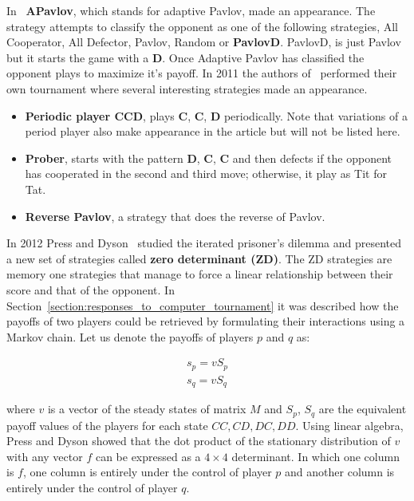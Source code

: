 \documentclass{article}
\theoremstyle{definition}
\begin{document}
In~\cite{Li2011} \textbf{APavlov},
which stands for adaptive Pavlov, made an appearance.  The strategy attempts to
classify the opponent as one of the following strategies, All Cooperator,
All Defector, Pavlov, Random or \textbf{PavlovD}. PavlovD, is just Pavlov
but it starts the game with a \textbf{D}. Once Adaptive Pavlov has classified
the opponent plays to maximize it's payoff.
In 2011 the authors of~\cite{Li2011} performed their own tournament where
several interesting strategies made an appearance.

\begin{itemize}
    \item \textbf{Periodic player CCD}, plays \textbf{C}, \textbf{C}, \textbf{D}
    periodically. Note that variations of a period player also make appearance
    in the article but will not be listed here.
    \item \textbf{Prober}, starts with the pattern \textbf{D}, \textbf{C}, \textbf{C}
     and then defects if the opponent has cooperated in the second and third move;
     otherwise, it play as Tit for Tat.
    \item \textbf{Reverse Pavlov}, a strategy that does the reverse of Pavlov.
\end{itemize}

In 2012 Press and Dyson~\cite{Press2012} studied the iterated prisoner's dilemma and presented
a new set of strategies called \textbf{zero determinant (ZD)}. The ZD strategies
are memory one strategies that manage to force a linear relationship between their
score and that of the opponent.
In Section~\ref{section:responses_to_computer_tournament} it was described how
the payoffs of two players could be retrieved by formulating their interactions
using a Markov chain. Let us denote the payoffs of players \(p\) and \(q\) as:

\begin{align*}
    s_p = v S_p \\
    s_q = v S_q
\end{align*}

where \(v\) is a vector of the steady states of matrix \(M\) and \(S_p\), \(S_q\)
are the equivalent payoff values of the players for each state \(CC, CD, DC, DD\).
Using linear algebra, Press and Dyson showed that the dot product of the stationary
distribution of \(v\) with any vector \(f\) can be expressed as a \(4\times 4\)
determinant. In which one column is \(f\), one column is entirely under the control
of player \(p\) and another column is entirely under the control of player \(q\).
\end{document}
